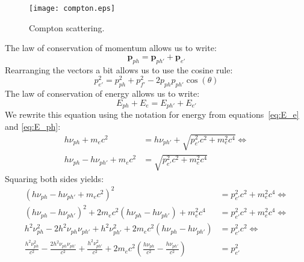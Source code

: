 \begin{figure}\begin{center}
\texttt{[image: compton.eps]}%
\caption{Compton scattering.}\label{fig:coll}
\end{center}\end{figure}

The law of conservation of momentum allows us to write:
\begin{equation}
\textbf{p}_{ph} = \textbf{p}_{ph'} + \textbf{p}_{e'}
\end{equation}
Rearranging the vectors a bit allows us to use the cosine rule:
\begin{equation}
p^2_{e'} = p^2_{ph} + p^2_{f'} - 2p_{ph}p_{ph'}\cos(\theta) \label{eq:en_final}
\end{equation}
The law of conservation of energy allows us to write:
\begin{equation}
E_{ph} +E_e = E_{ph'} + E_{e'}
\end{equation}
We rewrite this equation using the notation for energy from equations~\ref{eq:E_e} and \ref{eq:E_ph}:
\begin{align}
h \nu_{ph} + m_e c^2 &= h \nu_{ph'} + \sqrt{p^2_{e'}c^2 + m^2_e c^4} \Longleftrightarrow\\
h \nu_{ph} - h \nu_{ph'} + m_e c^2 &= \sqrt{p^2_{e'}c^2 + m^2_e c^4}
\end{align}
Squaring both sides yields:
\begin{align}
\left( h \nu_{ph} - h \nu_{ph'} + m_e c^2 \right)^2 &= p^2_{e'}c^2 + m^2_e c^4 \Longleftrightarrow\\
\left( h \nu_{ph} - h \nu_{ph'} \right)^2 + 2m_e c^2 \left( h \nu_{ph} - h \nu_{ph'}\right) + m^2_e c^4 &= p^2_{e'}c^2 + m^2_e c^4 \Longleftrightarrow\\
h^2\nu^2_{ph} - 2h^2\nu_{ph}\nu_{ph'} + h^2\nu^2_{ph'} + 2m_ec^2 \left( h\nu_{ph} - h\nu_{ph'} \right) &= p^2_{e'}c^2 \Longleftrightarrow\\
\frac{h^2\nu^2_{ph}}{c^2} - \frac{2h^2\nu_{ph}\nu_{ph'}}{c^2} + \frac{h^2\nu^2_{ph'}}{c^2}+ 2m_ec^2 \left(  \frac{h\nu_{ph}}{c^2} - \frac{h\nu_{ph'}}{c^2} \right) &= p^2_{e'} \label{eq:mom_final}
\end{align}

